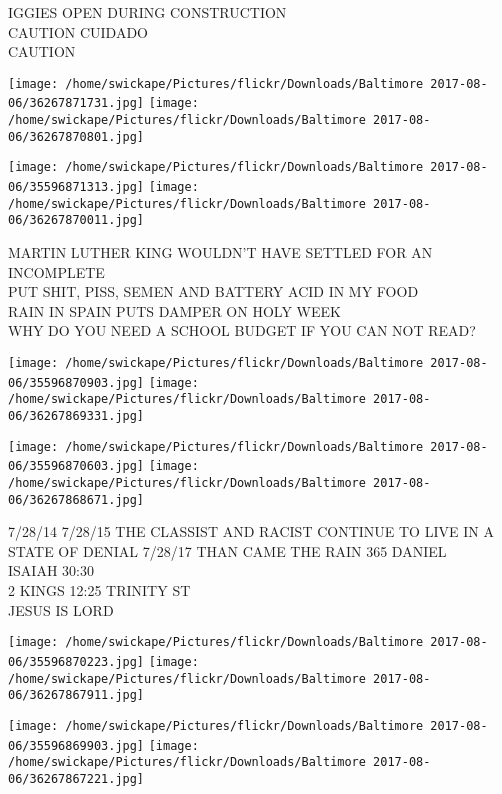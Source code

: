 \documentclass[10pt,letterpaper]{article}
\begin{document}
IGGIES OPEN DURING CONSTRUCTION\\
CAUTION CUIDADO\\
CAUTION\\
\pagebreak

\texttt{[image: /home/swickape/Pictures/flickr/Downloads/Baltimore 2017-08-06/36267871731.jpg]}
\texttt{[image: /home/swickape/Pictures/flickr/Downloads/Baltimore 2017-08-06/36267870801.jpg]}

\texttt{[image: /home/swickape/Pictures/flickr/Downloads/Baltimore 2017-08-06/35596871313.jpg]}
\texttt{[image: /home/swickape/Pictures/flickr/Downloads/Baltimore 2017-08-06/36267870011.jpg]}

MARTIN LUTHER KING WOULDN'T HAVE SETTLED FOR AN INCOMPLETE\\
PUT SHIT, PISS, SEMEN AND BATTERY ACID IN MY FOOD\\
RAIN IN SPAIN PUTS DAMPER ON HOLY WEEK\\
WHY DO YOU NEED A SCHOOL BUDGET IF YOU CAN NOT READ?\\
\pagebreak

\texttt{[image: /home/swickape/Pictures/flickr/Downloads/Baltimore 2017-08-06/35596870903.jpg]}
\texttt{[image: /home/swickape/Pictures/flickr/Downloads/Baltimore 2017-08-06/36267869331.jpg]}

\texttt{[image: /home/swickape/Pictures/flickr/Downloads/Baltimore 2017-08-06/35596870603.jpg]}
\texttt{[image: /home/swickape/Pictures/flickr/Downloads/Baltimore 2017-08-06/36267868671.jpg]}

7/28/14 7/28/15 THE CLASSIST AND RACIST CONTINUE TO LIVE IN A STATE OF DENIAL 7/28/17 THAN CAME THE RAIN 365 DANIEL\\
ISAIAH 30:30\\
2 KINGS 12:25 TRINITY ST\\
JESUS IS LORD\\
\pagebreak

\texttt{[image: /home/swickape/Pictures/flickr/Downloads/Baltimore 2017-08-06/35596870223.jpg]}
\texttt{[image: /home/swickape/Pictures/flickr/Downloads/Baltimore 2017-08-06/36267867911.jpg]}

\texttt{[image: /home/swickape/Pictures/flickr/Downloads/Baltimore 2017-08-06/35596869903.jpg]}
\texttt{[image: /home/swickape/Pictures/flickr/Downloads/Baltimore 2017-08-06/36267867221.jpg]}
\end{document}
